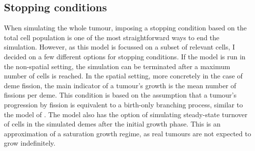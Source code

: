 \subsection{Stopping conditions}
When simulating the whole tumour, imposing a stopping condition based on the
total cell population is one of the most straightforward ways to end the
simulation. However, as this model is focussed on a subset of relevant cells, I
decided on a few different options for stopping conditions. If the model is run
in the non-spatial setting, the simulation can be terminated after a maximum
number of cells is reached. In the spatial setting, more concretely in the case
of deme fission, the main indicator of a tumour's growth is the mean number of
fissions per deme. This condition is based on the assumption that a tumour's
progression by fission is equivalent to a birth-only branching process, similar
to the model of \cite{sottoriva_big_2015}. The model also has the option of
simulating steady-state turnover of cells in the simulated demes after the
initial growth phase. This is an approximation of a saturation growth regime,
as real tumours are not expected to grow indefinitely.

